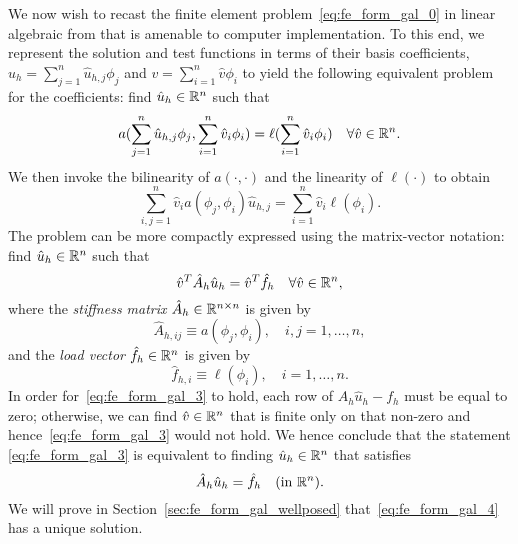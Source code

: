 We now wish to recast the finite element problem~\eqref{eq:fe_form_gal_0} in linear algebraic from that is amenable to computer implementation.  To this end, we represent the solution and test functions in terms of their basis coefficients, $u_h = \sum_{j=1}^n \hat u_{h,j} \phi_j$ and $v = \sum_{i=1}^n \hat v \phi_i$ to yield the following equivalent problem for the coefficients: find $\hat u_h \in \mathbb{R}^n$ such that
\begin{equation*}
  a(\sum_{j=1}^n \hat u_{h,j} \phi_j, \sum_{i=1}^n \hat v_i \phi_i)
  = \ell(\sum_{i=1}^n \hat v_i \phi_i) \quad \forall \hat v \in \mathbb{R}^n.
\end{equation*}
We then invoke the bilinearity of $a(\cdot,\cdot)$ and the linearity of $\ell(\cdot)$ to obtain
\begin{equation*}
  \sum_{i,j = 1}^n \hat v_i a(\phi_j,\phi_i) \hat u_{h,j} = \sum_{i=1}^n \hat v_i \ell(\phi_i).
\end{equation*}
The problem can be more compactly expressed using the matrix-vector notation: find $\hat u_h \in \mathbb{R}^n$ such that
\begin{equation}
  \hat v^T \hat A_h \hat u_h = \hat v^T \hat f_h \quad \forall \hat v \in \mathbb{R}^n,
  \label{eq:fe_form_gal_3}
\end{equation}
where the \emph{stiffness matrix} $\hat A_h \in \mathbb{R}^{n \times n}$ is given by
\begin{equation*}
  \hat A_{h,ij} \equiv a(\phi_j, \phi_i), \quad i,j = 1,\dots,n,
\end{equation*}
and the \emph{load vector} $\hat f_h \in \mathbb{R}^n$ is given by
\begin{equation*}
  \hat f_{h,i} \equiv \ell(\phi_i), \quad i = 1,\dots,n.
\end{equation*}
In order for~\eqref{eq:fe_form_gal_3} to hold, each row of $A_h \hat u_h - f_h$ must be equal to zero; otherwise, we can find $\hat v \in \mathbb{R}^n$ that is finite only on that non-zero and hence~\eqref{eq:fe_form_gal_3} would not hold.  We hence conclude that the statement \eqref{eq:fe_form_gal_3} is equivalent to finding $\hat u_h \in \mathbb{R}^n$ that satisfies 
\begin{equation}
  \hat A_h \hat u_h = \hat f_h  \quad \text{(in $\mathbb{R}^n$)}.
  \label{eq:fe_form_gal_4}
\end{equation}
We will prove in Section~\ref{sec:fe_form_gal_wellposed} that~\eqref{eq:fe_form_gal_4} has a unique solution.

